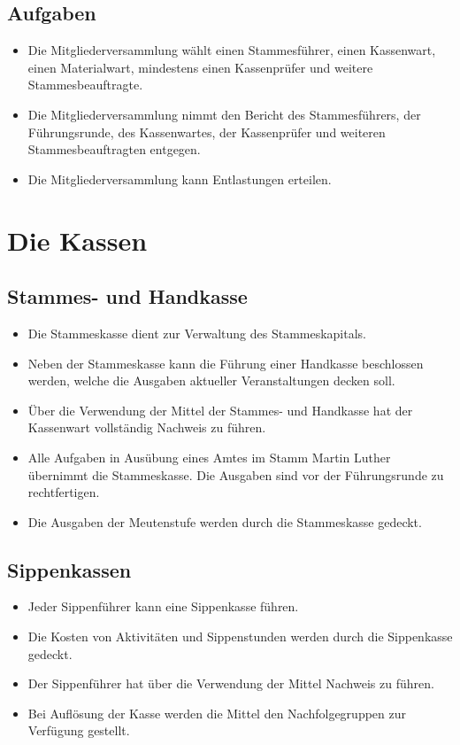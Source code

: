 \documentclass[a4paper]{article}
\begin{document}
    \subsection{Aufgaben} %
    \label{sub:aufgaben}
	\begin{itemize}
        \item Die Mitgliederversammlung wählt einen Stammesführer, einen Kassenwart, einen Materialwart, mindestens einen Kassenprüfer und weitere Stammesbeauftragte.
        \item Die Mitgliederversammlung nimmt den Bericht des Stammesführers, der Führungsrunde, des Kassenwartes, der Kassenprüfer und weiteren Stammesbeauftragten entgegen.
        \item Die Mitgliederversammlung kann Entlastungen erteilen.
	\end{itemize}


\section{Die Kassen} %
\label{sec:die_kassen}

    \subsection{Stammes- und Handkasse} %
    \label{sub:stammes_und_handkasse}
	\begin{itemize}
		\item Die Stammeskasse dient zur Verwaltung des Stammeskapitals. 
		\item Neben der Stammeskasse kann die Führung einer Handkasse beschlossen werden, welche die Ausgaben aktueller Veranstaltungen decken soll. 
		\item Über die Verwendung der Mittel der Stammes- und Handkasse hat der Kassenwart vollständig Nachweis zu führen. 
		\item Alle Aufgaben in Ausübung eines Amtes im Stamm Martin Luther übernimmt die Stammeskasse. Die Ausgaben sind vor der Führungsrunde zu rechtfertigen. 
		\item Die Ausgaben der Meutenstufe werden durch die Stammeskasse gedeckt. 
	\end{itemize}

    \subsection{Sippenkassen} %
    \label{sub:sippenkassen}
	\begin{itemize}
		\item Jeder Sippenführer kann eine Sippenkasse führen. 
		\item Die Kosten von Aktivitäten und Sippenstunden werden durch die Sippenkasse gedeckt. 
		\item Der Sippenführer hat über die Verwendung der Mittel Nachweis zu führen. 
		\item Bei Auflösung der Kasse werden die Mittel den Nachfolgegruppen zur Verfügung gestellt. 
	\end{itemize}
\end{document}
